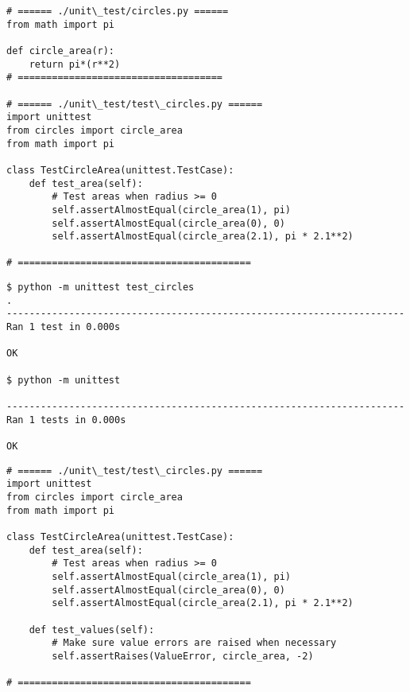 \documentclass{beamer}
\begin{document}
\begin{frame}[fragile]{}
\begin{verbatim}
# ====== ./unit\_test/circles.py ======
from math import pi

def circle_area(r):
    return pi*(r**2)
# ====================================

# ====== ./unit\_test/test\_circles.py ======
import unittest
from circles import circle_area
from math import pi

class TestCircleArea(unittest.TestCase):
    def test_area(self):
        # Test areas when radius >= 0
        self.assertAlmostEqual(circle_area(1), pi)
        self.assertAlmostEqual(circle_area(0), 0)
        self.assertAlmostEqual(circle_area(2.1), pi * 2.1**2)

# =========================================
\end{verbatim}
\end{frame}

\begin{frame}[fragile]{}
\begin{verbatim}
$ python -m unittest test_circles 
.
----------------------------------------------------------------------
Ran 1 test in 0.000s

OK

$ python -m unittest 

----------------------------------------------------------------------
Ran 1 tests in 0.000s

OK
\end{verbatim}
\end{frame}

\begin{frame}[fragile]{}
\begin{verbatim}
# ====== ./unit\_test/test\_circles.py ======
import unittest
from circles import circle_area
from math import pi

class TestCircleArea(unittest.TestCase):
    def test_area(self):
        # Test areas when radius >= 0
        self.assertAlmostEqual(circle_area(1), pi)
        self.assertAlmostEqual(circle_area(0), 0)
        self.assertAlmostEqual(circle_area(2.1), pi * 2.1**2)
    
    def test_values(self):
        # Make sure value errors are raised when necessary
        self.assertRaises(ValueError, circle_area, -2)

# =========================================
\end{verbatim}
\end{frame}
\end{document}
